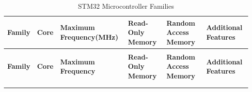 \begin{xltabular}{\linewidth}{@{}>{\bfseries}l X@{} X@{} X@{} X@{} X@{}}
	\caption{STM32 Microcontroller Families\label{tab:stm32_mcu_families}} \\
	\toprule
	\textbf{Family} & \textbf{Core} & \textbf{Maximum Frequency(MHz)} & \textbf{Read-Only Memory} & \textbf{Random Access Memory} & \textbf{Additional Features} \\
	\midrule
	\endfirsthead %
	
	 \\
	\toprule
	\textbf{Family} & \textbf{Core} & \textbf{Maximum Frequency} & \textbf{Read-Only Memory} & \textbf{Random Access Memory} & \textbf{Additional Features} \\
	\midrule
	\endhead %
	
	 \\
	\endfoot %
	
	\bottomrule
	\endlastfoot %
	

\end{xltabular}
